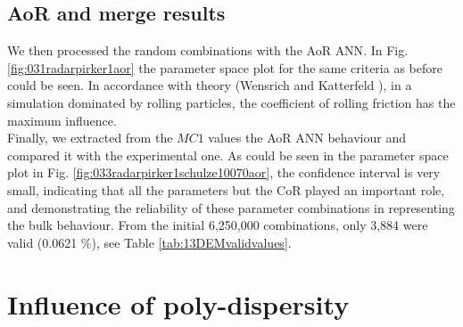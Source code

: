 \subsection{AoR and merge results}
\label{subsec:aorandmergeresults}

We then processed the random combinations with the \acs{AoR} \acs{ANN}. In Fig.
\ref{fig:031radarpirker1aor} the parameter space plot for the same criteria as
before could be seen.
In accordance with theory (Wensrich and Katterfeld \cite{RefWorks:87}), in a simulation dominated
by rolling particles, the coefficient of rolling friction has the maximum
influence. \\
Finally, we extracted from the $MC1$ values the \acs{AoR} \acs{ANN} behaviour
and compared it with the experimental one.
As could be seen in the parameter space plot in Fig.
\ref{fig:033radarpirker1schulze10070aor}, the confidence interval is very small,
indicating that all the parameters but the \acs{CoR} played an important role, 
and demonstrating the reliability of these parameter
combinations in representing the bulk behaviour.
From the initial 6,250,000 combinations, only 3,884 were valid (0.0621
\%), see Table \ref{tab:13DEMvalidvalues}.
% 











\section{Influence of poly-dispersity}
\label{sec:polydispersity}

% 
% 
% 
% 
% 
% 
% 
% 
% 
% 
% 
% 
% 


